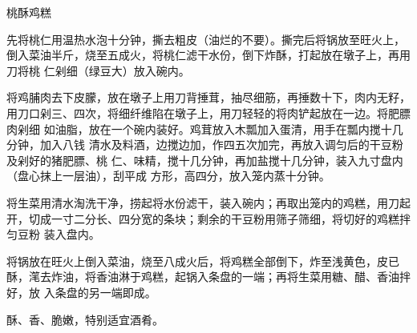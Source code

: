 \begin{recipe}{桃酥鸡糕}

\ingredients


\preparation

\step 先将桃仁用温热水泡十分钟，撕去粗皮（油烂的不要）。撕完后将锅放至旺火上，
倒入菜油半斤，烧至五成火，将桃仁滤干水份，倒下炸酥，打起放在墩子上，再用刀将桃
仁剁细（绿豆大）放入碗内。

\step 将鸡脯肉去下皮朦，放在墩子上用刀背捶茸，抽尽细筋，再捶数十下，肉内无籽，
用刀口剁三、四次，将细纤维陷在墩子上，用刀轻轻的将肉铲起放在一边。将肥膘肉剁细
如油脂，放在一个碗内装好。鸡茸放入木瓢加入蛋清，用手在瓢内搅十几分钟，加入八钱
清水及料酒，边搅边加，作四五次加完，再放入调匀后的干豆粉及剁好的猪肥膘、桃
仁、味精，搅十几分钟，再加盐搅十几分钟，装入九寸盘内（盘心抹上一层油），刮平成
方形，高四分，放入笼内蒸十分钟。

\step 将生菜用清水淘洗干净，捞起将水份滤干，装入碗内；再取出笼内的鸡糕，用刀起
开，切成一寸二分长、四分宽的条块；剩余的干豆粉用筛子筛细，将切好的鸡糕拌匀豆粉
装入盘内。

\step 将锅放在旺火上倒入菜油，烧至八成火后，将鸡糕全部倒下，炸至浅黄色，皮已
酥，滗去炸油，将香油淋于鸡糕，起锅入条盘的一端；再将生菜用糖、醋、香油拌好，放
入条盘的另一端即成。

\features

酥、香、脆嫩，特别适宜酒肴。

\end{recipe}


